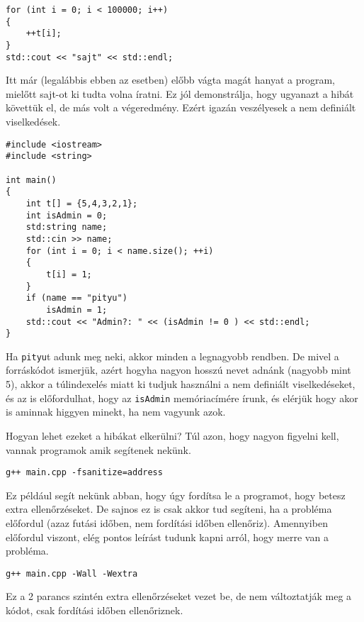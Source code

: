 \documentclass[a4paper,11.5pt]{article}
\begin{document}
\begin{example}
		\begin{lstlisting}
for (int i = 0; i < 100000; i++)
{
	++t[i];
}
std::cout << "sajt" << std::endl;
		\end{lstlisting} 
		Itt már (legalábbis ebben az esetben) előbb vágta magát hanyat a program, mielőtt sajt-ot ki tudta volna íratni. Ez jól demonstrálja, hogy ugyanazt  a hibát követtük el, de más volt a végeredmény. Ezért igazán veszélyesek a nem definiált viselkedések.
		\begin{lstlisting}
#include <iostream>
#include <string>

int main()
{
	int t[] = {5,4,3,2,1};
	int isAdmin = 0;
	std:string name;
	std::cin >> name;
	for (int i = 0; i < name.size(); ++i)
	{
		t[i] = 1;
	}
	if (name == "pityu")
		isAdmin = 1;
	std::cout << "Admin?: " << (isAdmin != 0 ) << std::endl;
}
		\end{lstlisting}
		Ha \texttt{pityu}t adunk meg neki, akkor minden a legnagyobb rendben. De mivel a forráskódot ismerjük, azért hogyha nagyon hosszú nevet adnánk (nagyobb mint 5), akkor a túlindexelés miatt ki tudjuk használni a nem definiált viselkedéseket, és az is előfordulhat, hogy az \texttt{isAdmin} memóriacímére írunk, és elérjük hogy akor is aminnak higgyen minekt, ha nem vagyunk azok.
		\medskip
		
		Hogyan lehet ezeket a hibákat elkerülni? Túl azon, hogy nagyon figyelni kell, vannak programok amik segítenek nekünk.
		
		{\centering\texttt{g++ main.cpp -fsanitize=address}\par }
		
		Ez például segít nekünk abban, hogy úgy fordítsa le a programot, hogy betesz extra ellenőrzéseket. De sajnos ez is csak akkor tud segíteni, ha a probléma előfordul (azaz futási időben, nem fordítási időben ellenőriz). Amennyiben előfordul viszont, elég pontos leírást tudunk kapni arról, hogy merre van a probléma.
		
		{\centering \texttt{g++ main.cpp -Wall -Wextra} \par}
		
		Ez a 2 parancs szintén extra ellenőrzéseket vezet be, de nem változtatják meg a kódot, csak fordítási időben ellenőriznek.
	\end{example}
\end{document}
